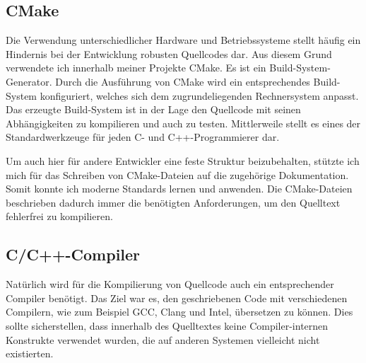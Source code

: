 \documentclass[crop=false]{standalone}
\begin{document}
  \subsection{CMake} %
  \label{sub:cmake}
    Die Verwendung unterschiedlicher Hardware und Betriebssysteme stellt häufig ein Hindernis bei der Entwicklung robusten Quellcodes dar.
    Aus diesem Grund verwendete ich innerhalb meiner Projekte CMake.
    Es ist ein Build-System-Generator.
    Durch die Ausführung von CMake wird ein entsprechendes Build-System konfiguriert, welches sich dem zugrundeliegenden Rechnersystem anpasst.
    Das erzeugte Build-System ist in der Lage den Quellcode mit seinen Abhängigkeiten zu kompilieren und auch zu testen.
    Mittlerweile stellt es eines der Standardwerkzeuge für jeden C- und C++-Programmierer dar.

    Um auch hier für andere Entwickler eine feste Struktur beizubehalten, stützte ich mich für das Schreiben von CMake-Dateien auf die zugehörige Dokumentation.
    Somit konnte ich moderne Standards lernen und anwenden.
    Die CMake-Dateien beschrieben dadurch immer die benötigten Anforderungen, um den Quelltext fehlerfrei zu kompilieren.

  \subsection{C/C++-Compiler} %
  \label{sub:c_c_compiler}
    Natürlich wird für die Kompilierung von Quellcode auch ein entsprechender Compiler benötigt.
    Das Ziel war es, den geschriebenen Code mit verschiedenen Compilern, wie zum Beispiel GCC, Clang und Intel, übersetzen zu können.
    Dies sollte sicherstellen, dass innerhalb des Quelltextes keine Compiler-internen Konstrukte verwendet wurden, die auf anderen Systemen vielleicht nicht existierten.

\end{document}
